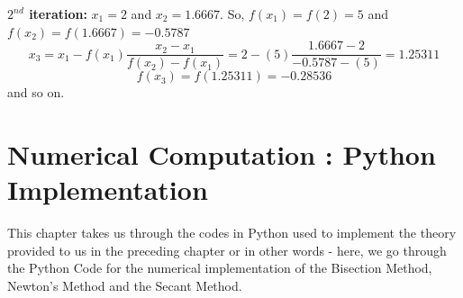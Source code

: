 \documentclass[a4paper, 12pt]{report}
\begin{document}
    \textbf{$2^{nd}$ iteration:} $x_{1}=2$ and $x_{2}=1.6667$. So, $f(x_{1})=f(2)=5$ and $f(x_{2})=f(1.6667)=-0.5787$
    \begin{equation}
    x_{3} = x_{1} - f(x_{1})\frac{x_{2} - x_{1}}{f(x_{2}) -f(x_{1}) } = 2-(5)\frac{1.6667-2}{-0.5787-(5)} = 1.25311
    \end{equation}
    \begin{equation}
        f(x_{3}) =f(1.25311) = -0.28536
    \end{equation}
    and so on.


 \chapter{ Numerical Computation : Python Implementation}
This chapter takes us through the codes in Python used to implement the theory provided to us in the preceding chapter or in other words - here, we go through the Python Code for the numerical implementation of the Bisection Method, Newton's Method and the Secant Method.
\end{document}
